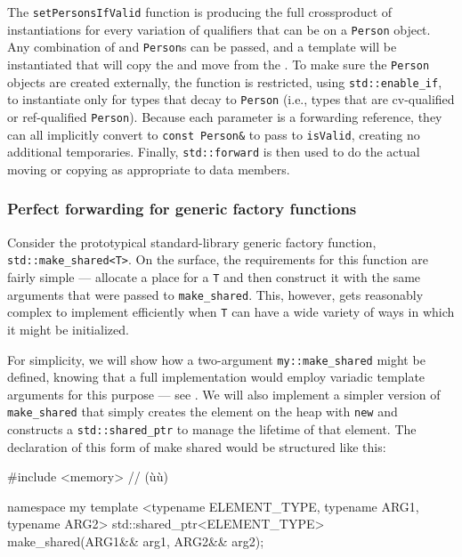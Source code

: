 \noindent The \lstinline!setPersonsIfValid! function is producing the full crossproduct of instantiations for every variation of qualifiers that can be
on a \lstinline!Person! object. Any combination of  and
 \lstinline!Person!s can be passed, and a template will be
instantiated that will copy the  and move from the
. To make sure the \lstinline!Person! objects are
created externally, the function is restricted, using
\lstinline!std::enable_if!, to instantiate only for types that decay to
\lstinline!Person! (i.e., types that are cv-qualified or ref-qualified
\lstinline!Person!). Because each parameter is a forwarding reference, they
can all implicitly convert to \lstinline!const!~\lstinline!Person&! to pass
to \lstinline!isValid!, creating no additional temporaries. Finally,
\lstinline!std::forward! is then used to do the actual moving or copying as
appropriate to data members.

\subsubsection[Perfect forwarding for generic factory functions]{Perfect forwarding for generic factory functions}\label{perfect-forwarding-for-generic-factory-functions}

Consider the prototypical standard-library generic factory function,
\lstinline!std::make_shared<T>!. On the surface, the requirements for this
function are fairly simple --- allocate a place for a \lstinline!T! and
then construct it with the same arguments that were passed to
\lstinline!make_shared!. This, however, gets reasonably complex to
implement efficiently when \lstinline!T! can have a wide variety of ways in
which it might be initialized.

For simplicity, we will show how a two-argument \lstinline!my::make_shared!
might be defined, knowing that a full implementation would employ
variadic template arguments for this purpose --- see . 
We will also implement a simpler
version of \lstinline!make_shared! that simply creates the element on the
heap with \lstinline!new! and constructs a \lstinline!std::shared_ptr! to
manage the lifetime of that element. The declaration of this form of
make shared would be structured like this:

\begin{emcppshiddenlisting}[emcppsbatch=e9]
#include <memory>  // (ù{}ù)
\end{emcppshiddenlisting}
\begin{emcppslisting}[emcppsbatch=e9]
namespace my {
template <typename ELEMENT_TYPE, typename ARG1, typename ARG2>
std::shared_ptr<ELEMENT_TYPE> make_shared(ARG1&& arg1, ARG2&& arg2);
}
\end{emcppslisting}

